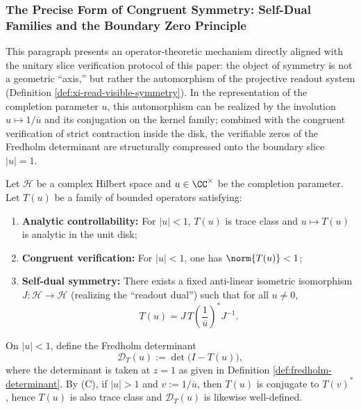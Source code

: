 \subsubsection{The Precise Form of Congruent Symmetry: Self-Dual Families and the Boundary Zero Principle}\label{subsec:xi-contractive-symmetry-boundary-zero}
This paragraph presents an operator-theoretic mechanism directly aligned with the unitary slice verification protocol of this paper: the object of symmetry is not a geometric ``axis,'' but rather the automorphism of the projective readout system (Definition \ref{def:xi-read-visible-symmetry}).
In the representation of the completion parameter \(u\), this automorphism can be realized by the involution \(u\mapsto 1/\overline u\) and its conjugation on the kernel family; combined with the congruent verification of strict contraction inside the disk, the verifiable zeros of the Fredholm determinant are structurally compressed onto the boundary slice \(|u|=1\).
\par

\begin{definition}\label{def:xi-contractive-selfdual-family}
Let \(\mathcal{H}\) be a complex Hilbert space and \(u\in\CC^\times\) be the completion parameter.
Let \(T(u)\) be a family of bounded operators satisfying:
\begin{enumerate}
  \item[\textbf{(A)}] \textbf{Analytic controllability:}
  For \(|u|<1\), \(T(u)\) is trace class and \(u\mapsto T(u)\) is analytic in the unit disk;
  \item[\textbf{(B)}] \textbf{Congruent verification:}
  For \(|u|<1\), one has \(\norm{T(u)}<1\);
  \item[\textbf{(C)}] \textbf{Self-dual symmetry:}
  There exists a fixed anti-linear isometric isomorphism \(J:\mathcal{H}\to\mathcal{H}\) (realizing the ``readout dual'') such that for all \(u\neq 0\),
  \[
  T(u)=J\,T\!\left(\frac{1}{\overline u}\right)^{*}J^{-1}.
  \]
\end{enumerate}
On \(|u|<1\), define the Fredholm determinant
\[
\mathcal{D}_T(u):=\det\!\bigl(I-T(u)\bigr),
\]
where the determinant is taken at \(z=1\) as given in Definition \ref{def:fredholm-determinant}.
By (C), if \(|u|>1\) and \(v:=1/\overline u\), then \(T(u)\) is conjugate to \(T(v)^{*}\), hence \(T(u)\) is also trace class and \(\mathcal{D}_T(u)\) is likewise well-defined.
\end{definition}

